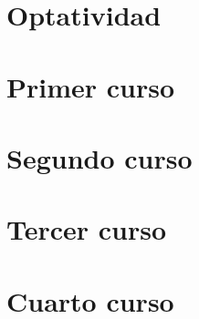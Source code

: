 \section{Optatividad}

\section{Primer curso}


\section{Segundo curso}

\section{Tercer curso}

\section{Cuarto curso}

